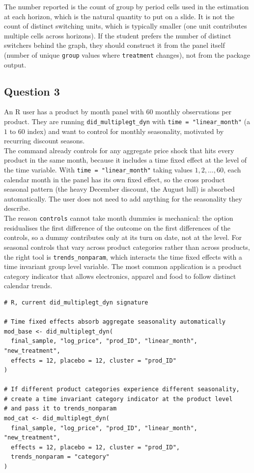  The number reported is the count of group by period cells used in the estimation at each horizon, which is the natural quantity to put on a slide. It is not the count of distinct switching units, which is typically smaller (one unit contributes multiple cells across horizons). If the student prefers the number of distinct switchers behind the graph, they should construct it from the panel itself (number of unique \texttt{group} values where \texttt{treatment} changes), not from the package output.

\subsection*{Question 3}

 An R user has a product by month panel with 60 monthly observations per product. They are running \texttt{did\_multiplegt\_dyn} with \texttt{time = "linear\_month"} (a $1$ to $60$ index) and want to control for monthly seasonality, motivated by recurring discount seasons.\\

 The command already controls for any aggregate price shock that hits every product in the same month, because it includes a time fixed effect at the level of the time variable. With \texttt{time = "linear\_month"} taking values $1, 2, \dots, 60$, each calendar month in the panel has its own fixed effect, so the cross product seasonal pattern (the heavy December discount, the August lull) is absorbed automatically. The user does not need to add anything for the seasonality they describe.\\

The reason \texttt{controls} cannot take month dummies is mechanical: the option residualises the first difference of the outcome on the first differences of the controls, so a dummy contributes only at its turn on date, not at the level. For seasonal controls that vary across product categories rather than across products, the right tool is \texttt{trends\_nonparam}, which interacts the time fixed effects with a time invariant group level variable. The most common application is a product category indicator that allows electronics, apparel and food to follow distinct calendar trends.

\begin{lstlisting}
# R, current did_multiplegt_dyn signature

# Time fixed effects absorb aggregate seasonality automatically
mod_base <- did_multiplegt_dyn(
  final_sample, "log_price", "prod_ID", "linear_month", "new_treatment",
  effects = 12, placebo = 12, cluster = "prod_ID"
)

# If different product categories experience different seasonality,
# create a time invariant category indicator at the product level
# and pass it to trends_nonparam
mod_cat <- did_multiplegt_dyn(
  final_sample, "log_price", "prod_ID", "linear_month", "new_treatment",
  effects = 12, placebo = 12, cluster = "prod_ID",
  trends_nonparam = "category"
)
\end{lstlisting}

